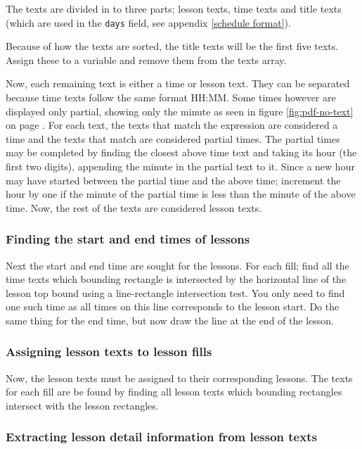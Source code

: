 \documentclass{article}
\begin{document}
	The texts are divided in to three parts; lesson texts, time texts and title texts (which are used in the \texttt{days} field, see appendix \ref{schedule format}).
	
	Because of how the texts are sorted, the title texts will be the first five texts. Assign these to a variable and remove them from the texts array.
	
	Now, each remaining text is either a time or lesson text. They can be separated because time texts follow the same format HH:MM. Some times however are displayed only partial, showing only the minute as seen in figure \ref{fig:pdf-no-text} on page \pageref{fig:pdf-no-text}. For each text, the texts that match the expression  %
	are considered a time and the texts that match  %
	are considered partial times. The partial times may be completed by finding the closest above time text and taking its hour (the first two digits), appending the minute in the partial text to it. Since a new hour may have started between the partial time and the above time; increment the hour by one if the minute of the partial time is less than the minute of the above time. Now, the rest of the texts are considered lesson texts.
	
	\subsubsection{Finding the start and end times of lessons}
	Next the start and end time are sought for the lessons. For each fill; find all the time texts which bounding rectangle is intersected by the horizontal line of the lesson top bound using a line-rectangle intersection test. You only need to find one such time as all times on this line corresponds to the lesson start. Do the same thing for the end time, but now draw the line at the end of the lesson.
	
	\subsubsection{Assigning lesson texts to lesson fills}
	Now, the lesson texts must be assigned to their corresponding lessons. The texts for each fill are be found by finding all lesson texts which bounding rectangles intersect with the lesson rectangles.
	
	\subsubsection{Extracting lesson detail information from lesson texts}
	
\end{document}
